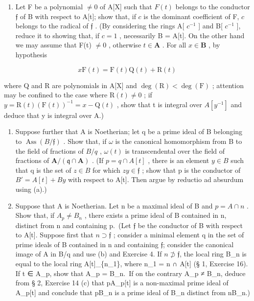 \begin{enumerate}
\def\labelenumi{(\alph{enumi})}
\tightlist
\item
  Let F be a polynomial \(\neq 0\) of A{[}X{]} such that \(F(t)\) belongs to the conductor \(\mathfrak{f}\) of B with respect to A{[}t{]}; show that, if \(c\) is the dominant coefficient of F, \(c\) belongs to the radical of \(\mathfrak{f}\) . (By considering the rings A{[} \(c^{-1}\) {]} and B{[} \(c^{-1}\) {]}, reduce it to showing that, if \(c = 1\) , necessarily B = A{[}t{]}. On the other hand we may assume that F(t) \(\neq 0\) , otherwise \(t \in \mathbf{A}\) . For all \(x \in \mathbf{B}\) , by hypothesis
\end{enumerate}

\[
x \mathrm{F} (t) = \mathrm{F} (t) \mathrm{Q} (t) + \mathrm{R} (t)
\]

where Q and R are polynomials in A{[}X{]} and \(\deg(\mathrm{R}) < \deg(\mathrm{F})\) ; attention may be confined to the case where \(\mathrm{R}(t) \neq 0\) ; if \(y = \mathrm{R}(t)(\mathrm{F}(t))^{-1} = x - \mathrm{Q}(t)\) , show that t is integral over \(A[y^{-1}]\) and deduce that y is integral over A.)

\begin{enumerate}
\def\labelenumi{(\alph{enumi})}
\setcounter{enumi}{1}
\item
  Suppose further that A is Noetherian; let q be a prime ideal of B belonging to \(\operatorname{Ass}(B/\mathfrak{f})\) . Show that, if \(\omega\) is the canonical homomorphism from B to the field of fractions of \(B/q\) , \(\omega(t)\) is transcendental over the field of fractions of \(\mathbf{A}/(\mathfrak{q} \cap \mathbf{A})\) . (If \(p = q \cap A[t]\) , there is an element \(y \in B\) such that q is the set of \(z \in B\) for which \(zy \in \mathfrak{f}\) ; show that p is the conductor of \(B' = A[t] + By\) with respect to A{[}t{]}. Then argue by reductio ad absurdum using (a).)
\item
  Suppose that A is Noetherian. Let n be a maximal ideal of B and \(p = A \cap n\) . Show that, if \(A_{p} \neq B_{n}\) , there exists a prime ideal of B contained in n, distinct from n and containing p.~(Let \(\mathfrak{f}\) be the conductor of B with respect to A{[}t{]}. Suppose first that \(n \supset \mathfrak{f}\) ; consider a minimal element q in the set of prime ideals of B contained in n and containing \(\mathfrak{f}\); consider the canonical image of A in B/q and use (b) and Exercise 4. If \(n \not\supset \mathfrak{f}\), the local ring B\_n is equal to the local ring A{[}t{]}\_\{n\_1\}, where n\_1 = n ∩ A{[}t{]} (§ 1, Exercise 16). If t ∈ A\_p, show that A\_p = B\_n.~If on the contrary A\_p ≠ B\_n, deduce from § 2, Exercise 14 (c) that pA\_p{[}t{]} is a non-maximal prime ideal of A\_p{[}t{]} and conclude that pB\_n is a prime ideal of B\_n distinct from nB\_n.)
\end{enumerate}

